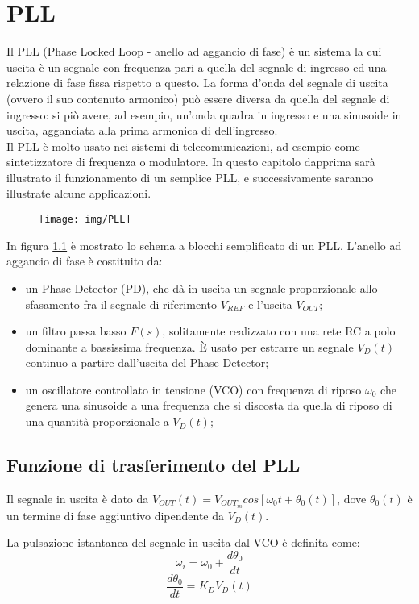 \chapter{PLL}
Il PLL (Phase Locked Loop - anello ad aggancio di fase) è un sistema la cui uscita è un segnale con frequenza pari a quella del segnale di ingresso ed una relazione di fase fissa rispetto a questo. La forma d'onda del segnale di uscita (ovvero il suo contenuto armonico) può essere diversa	da quella del segnale di ingresso: si piò avere, ad esempio, un'onda quadra in ingresso e una sinusoide in uscita, agganciata alla prima armonica di dell'ingresso.\\
Il PLL è molto usato nei sistemi di telecomunicazioni, ad esempio come sintetizzatore di frequenza o modulatore.
In questo capitolo dapprima sarà illustrato il funzionamento di un semplice PLL, e successivamente
saranno illustrate alcune applicazioni.

\begin{figure}[hb]
	\centering
	\texttt{[image: img/PLL]}
	\caption{}
	\label{fig:pll}
\end{figure}

In figura \ref{fig:pll} è mostrato lo schema a blocchi semplificato di un PLL. L'anello ad aggancio di fase è
costituito da:
\begin{itemize}
	\item un Phase Detector (PD), che dà in uscita un segnale proporzionale allo sfasamento fra il segnale di riferimento $V_{REF}$ e l'uscita $V_{OUT}$;
	\item un filtro passa basso $F(s)$, solitamente realizzato con una rete RC a polo dominante a bassissima frequenza. È usato per estrarre un segnale $V_D (t)$ continuo a partire dall'uscita del Phase Detector;
	\item un oscillatore controllato in tensione (VCO) con frequenza di riposo $\omega_0$ che genera una sinusoide a una frequenza che si discosta da quella di riposo di una quantità proporzionale a $V_D (t)$;
\end{itemize}

\section{Funzione di trasferimento del PLL}
Il segnale in uscita è dato da $V_{OUT} (t) = V_{{OUT}_m} cos \left[ \omega_0 t + \theta_0(t) \right]$, dove $\theta_0(t)$ è un termine di fase aggiuntivo dipendente da $V_D(t)$.

La pulsazione istantanea del segnale in uscita dal VCO è definita come:
\[\omega_i = \omega_0 + \frac{d \theta_0}{dt}\]
\[\frac{d\theta_0}{dt} = K_D V_D(t)\]


